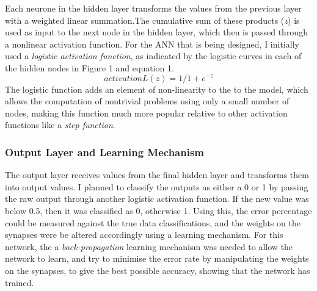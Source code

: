 \documentclass[11pt]{article}
\begin{document}
Each neurone in the hidden layer transforms the values from the previous layer with a weighted linear summation.The cumulative sum of these products (\textit{z}) is used as input to the next node in the hidden layer, which then is passed through a nonlinear activation function. For the ANN that is being designed, I initially used a \textit{logistic activation function}, as indicated by the logistic curves in each of the hidden nodes in Figure 1 and equation 1. \begin{equation} activationL(z) = 1/1+e^{-z} \end{equation}
The logistic function adds an element of non-linearity to the to the model, which allows the computation of nontrivial problems using only a small number of nodes, making this function much more popular relative to other activation functions like a \textit{step function}.
\subsubsection{Output Layer and Learning Mechanism}\label{subsubsec:output}
The output layer receives values from the final hidden layer and transforms them into output values. I planned to classify the outputs as either a 0 or 1 by passing the raw output through another logistic activation function. If the new value was below 0.5, then it was classified as 0, otherwise 1. Using this, the error percentage could be measured against the true data classifications, and the weights on the synapses were be altered accordingly using a learning mechanism. For this network, the a \textit{back-propagation} learning mechanism was needed to allow the network to learn, and try to minimise the error rate by manipulating the weights on the synapses, to give the best possible accuracy, showing that the network has trained.\\
\end{document}
